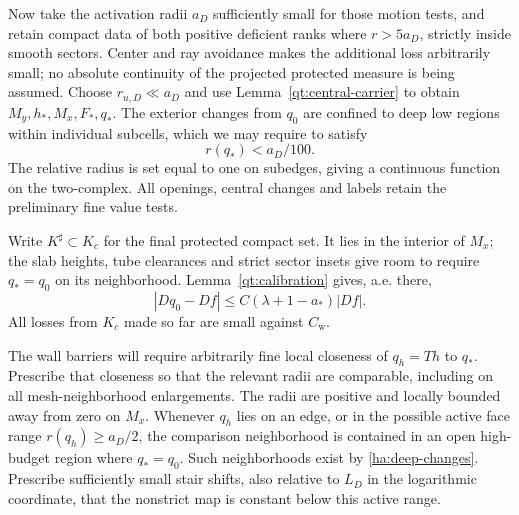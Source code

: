 Now take the activation radii $a_D$ sufficiently small for those
motion tests, and retain compact data of both positive deficient
ranks where $r>5a_D$, strictly inside smooth sectors.  Center and ray
avoidance makes the additional loss arbitrarily small; no absolute
continuity of the projected protected measure is being assumed.
Choose $r_{u,D}\ll a_D$ and use
Lemma~\ref{qt:central-carrier} to obtain
$M_y,h_*,M_x,F_*,q_*$.  The exterior changes from $q_0$ are confined
to deep low regions within individual subcells, which we may require
to satisfy
\begin{equation}\label{ha:deep-changes}
                         r(q_*)<a_D/100.
\end{equation}
The relative radius is set equal to one on subedges, giving a
continuous function on the two-complex.  All openings, central changes
and labels retain the preliminary fine value tests.

Write $K^\sharp\subset K_c$ for the final protected compact set.
It lies in the interior of $M_x$; the slab heights, tube clearances
and strict sector insets give room to require $q_*=q_0$ on its
neighborhood.  Lemma~\ref{qt:calibration} gives, a.e. there,
\begin{equation}\label{ha:relative-calibration}
                   |Dq_0-Df|\le C(\lambda+1-a_*)|Df|.
\end{equation}
All losses from $K_c$ made so far are small against $C_{\mathrm w}$.

The wall barriers will require arbitrarily fine local closeness of
$q_h=Th$ to $q_*$.  Prescribe that closeness so that the relevant radii
are comparable, including on all mesh-neighborhood enlargements.
The radii are positive and locally bounded away from zero on $M_x$.
Whenever $q_h$ lies on an edge, or in the possible active face range
$r(q_h)\ge a_D/2$, the comparison neighborhood is contained in an
open high-budget region where $q_*=q_0$.  Such neighborhoods exist by
\eqref{ha:deep-changes}.  Prescribe sufficiently small stair shifts,
also relative to $L_D$ in the logarithmic coordinate, that the
nonstrict map is constant below this active range.

